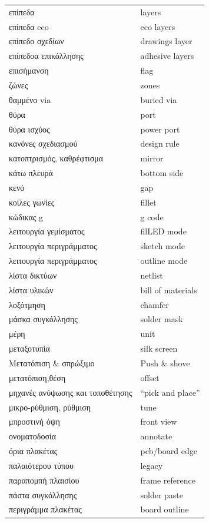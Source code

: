 \documentclass[a4paper]{article}
\begin{document}
\begin{longtabu}{ l l }
    επίπεδα	&	layers	\\
    επίπεδα eco	&	eco layers	\\
    επίπεδο σχεδίων	&	drawings layer	\\
    επίπεδοα επικόλλησης	&	adhesive layers	\\
    επισήμανση	&	flag	\\
    ζώνες	&	zones	\\
    θαμμένο via	&	buried via	\\
    θύρα	&	port	\\
    θύρα ισχύος	&	power port	\\
    κανόνες σχεδιασμού	&	design rule	\\
    κατοπτρισμός, καθρέφτισμα	&	mirror	\\
    κάτω πλευρά	&	bottom side	\\
    κενό	&	gap	\\
    κοίλες γωνίες	&	fillet	\\
    κώδικας g	&	g code	\\
    λειτουργία γεμίσματος	&	fil\textenglish{LED} mode	\\
    λειτουργία περιγράμματος	&	sketch mode	\\
    λειτουργία περιγράμματος	&	outline mode	\\
    λίστα δικτύων	&	netlist	\\
    λίστα υλικών	&	bill of materials	\\
    λοξότμηση	&	chamfer	\\
    μάσκα συγκόλλησης	&	solder mask	\\
    μέρη	&	unit	\\
    μεταξοτυπία	&	silk screen	\\
    Μετατόπιση \& σπρώξιμο	&	Push \& shove	\\
    μετατόπιση,θέση	&	offset	\\
    μηχανές ανύψωσης και τοποθέτησης	&	“pick and place”	\\
    μικρο-ρύθμιση, ρύθμιση	&	tune	\\
    μπροστινή όψη	&	front view	\\
    ονοματοδοσία	&	annotate	\\
    όρια πλακέτας	&	pcb/board edge	\\
    παλαιότερου τύπου	&	legacy	\\
    παραπομπή πλαισίου	&	frame reference	\\
    πάστα συγκόλλησης	&	solder paste	\\
    περιγράμμα πλακέτας	&	board outline	\\

\end{longtabu}
\end{document}
